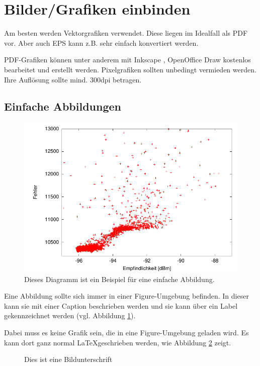 \section{Bilder/Grafiken einbinden}

Am besten werden Vektorgrafiken verwendet.
Diese liegen im Idealfall als PDF vor.
Aber auch EPS kann z.B. sehr einfach konvertiert werden.

PDF-Grafiken können unter anderem mit Inkscape \cite{inkscape}, OpenOffice Draw \cite{oodraw} kostenlos bearbeitet und erstellt werden.
Pixelgrafiken sollten unbedingt vermieden werden. 
Ihre Auflösung sollte mind. 300dpi betragen.

\subsection{Einfache Abbildungen}

\begin{figure}
\centering %
\includegraphics[width=0.6\linewidth]{Images/Chapter/bspgrafik1} %
\caption{Dieses Diagramm ist ein Beispiel für eine einfache Abbildung.}\label{fig:testabb}
\end{figure}


Eine Abbildung sollte sich immer in einer Figure-Umgebung befinden.
In dieser kann sie mit einer Caption beschrieben werden
und sie kann über ein Label gekennzeichnet werden (vgl. Abbildung \ref{fig:testabb}).

Dabei muss es keine Grafik sein, die in eine Figure-Umgebung geladen wird.
Es kann dort ganz normal \LaTeX geschrieben werden,
wie Abbildung \ref{fig:testabb2} zeigt.

\begin{figure}
\centering
{}
\caption{Dies ist eine Bildunterschrift} \label{fig:testabb2}
\end{figure}

